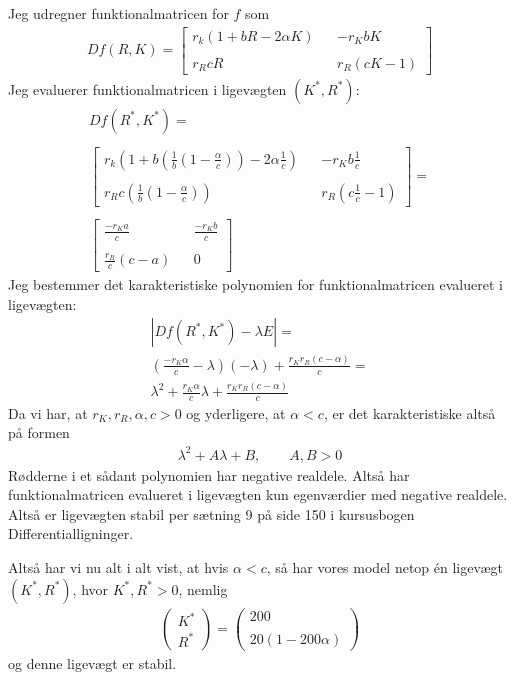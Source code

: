 \documentclass[12pt]{article}
\begin{document}
Jeg udregner funktionalmatricen for $f$ som
\begin{align}
Df(R,K) = \begin{bmatrix}
r_k(1 + bR -2\alpha K) & & -r_KbK \\ \\
r_RcR & & r_R(cK - 1)
\end{bmatrix}
\end{align}
Jeg evaluerer funktionalmatricen i ligevægten $(K^*, R^*)$:
\begin{align}
Df(R^*,K^*) =  \\ \\
\begin{bmatrix}
r_k\left(1 + b\left(\frac{1}{b}\left( 1 - \frac{\alpha}{c} \right) \right) -2\alpha\frac{1}{c} \right) & & -r_Kb\frac{1}{c} \\ \\
r_Rc\left(\frac{1}{b}\left( 1 - \frac{\alpha}{c} \right) \right) & & r_R\left(c\frac{1}{c} - 1\right)
\end{bmatrix} = \\ \\
\begin{bmatrix}
\frac{-r_Ka}{c} & & \frac{-r_Kb}{c} \\ \\
\frac{r_R}{c}( c- a ) & & 0
\end{bmatrix}
\end{align}
Jeg bestemmer det karakteristiske polynomien for funktionalmatricen evalueret i ligevægten:
\begin{align}
|Df(R^*,K^*) - \lambda E| = \\ 
\left(\frac{-r_K\alpha}{c} - \lambda \right)(-\lambda) + \frac{r_Kr_R(c-\alpha)}{c} = \\
\lambda^2 + \frac{r_K\alpha}{c}\lambda + \frac{r_Kr_R(c-\alpha)}{c}
\end{align}
Da vi har, at $r_K, r_R, \alpha, c>0$ og yderligere, at $\alpha<c$, er det karakteristiske altså på formen
\begin{align}
\lambda^2 + A\lambda + B, \qquad A,B >0
\end{align}
Rødderne i et sådant polynomien har negative realdele. Altså har funktionalmatricen evalueret i ligevægten kun egenværdier med negative realdele. Altså er ligevægten stabil per sætning 9 på side 150 i kursusbogen Differentialligninger.

Altså har vi nu alt i alt vist, at hvis $\alpha<c$, så har vores model netop én ligevægt $(K^*, R^*)$, hvor $K^*, R^*>0$, nemlig
\begin{align}
\begin{pmatrix}
K^* \\ R^* 
\end{pmatrix} = \begin{pmatrix}
200 \\ \\
20\left( 1 - 200\alpha \right)
\end{pmatrix}
\end{align}
og denne ligevægt er stabil. 
\end{document}
